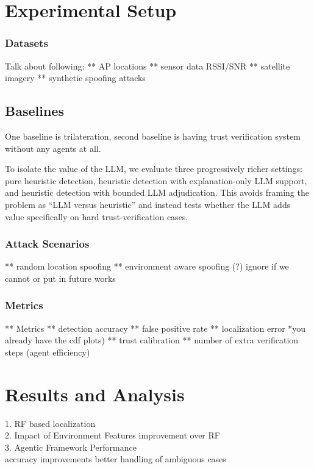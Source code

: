 \documentclass[10pt, twocolumn, letterpaper]{article}
\begin{document}
\section{Experimental Setup}

\subsubsection{Datasets}
Talk about following:
** AP locations
** sensor data RSSI/SNR
** satellite imagery
** synthetic spoofing attacks

\subsection{Baselines}
One baseline is trilateration, second baseline is having trust verification system without any agents at all.

To isolate the value of the LLM, we evaluate three progressively richer settings: pure heuristic detection, heuristic detection with explanation-only LLM support, and heuristic detection with bounded LLM adjudication. This avoids framing the problem as ``LLM versus heuristic'' and instead tests whether the LLM adds value specifically on hard trust-verification cases.

\subsubsection{Attack Scenarios}
** random location spoofing
** environment aware spoofing (?) ignore if we cannot or put in future works

\subsubsection{Metrics}

** Metrics
** detection accuracy
** false positive rate
** localization error *you already have the cdf plots)
** trust calibration
** number of extra verification steps (agent efficiency)

\section{Results and Analysis}

1. RF based localization \\
2. Impact of Environment Features
improvement over RF \\
3. Agentic Framework Performance \\ accuracy improvements
better handling of ambiguous cases
\end{document}

